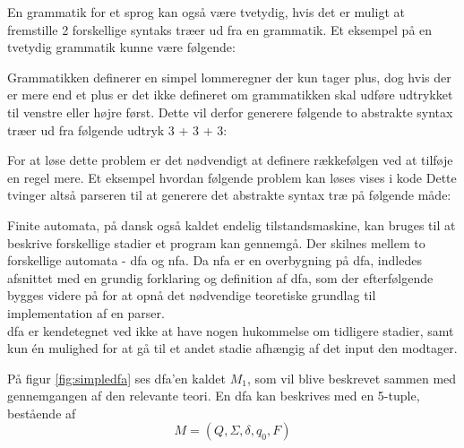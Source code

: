 

\noindent En grammatik for et sprog kan også være tvetydig, hvis det er muligt at fremstille 2 forskellige syntaks træer ud fra en grammatik. Et eksempel på en tvetydig grammatik kunne være følgende:




\noindent Grammatikken definerer en simpel lommeregner der kun tager plus, dog hvis der er mere end et plus er det ikke defineret om grammatikken skal udføre udtrykket til venstre eller højre først. Dette vil derfor generere følgende to abstrakte syntax træer ud fra følgende udtryk 3 + 3 + 3: 

\noindent For at løse dette problem er det nødvendigt at definere rækkefølgen ved at tilføje en regel mere. Et eksempel hvordan følgende problem kan løses vises i kode 
Dette tvinger altså parseren til at generere det abstrakte syntax træ på følgende måde:

Finite automata, på dansk også kaldet endelig tilstandsmaskine, kan bruges til at beskrive forskellige stadier et program kan gennemgå. Der skilnes mellem to forskellige automata - \gls{dfa} og \gls{nfa}. Da \gls{nfa} er en overbygning på \gls{dfa}, indledes afsnittet med en grundig forklaring og definition af \gls{dfa}, som der efterfølgende bygges videre på for at opnå det nødvendige teoretiske grundlag til implementation af en parser.\\

\noindent \gls{dfa} er kendetegnet ved ikke at have nogen hukommelse om tidligere stadier, samt kun én mulighed for at gå til et andet stadie afhængig af det input den modtager.


\noindent På figur \ref{fig:simpledfa} ses \gls{dfa}'en kaldet $M_1$, som vil blive beskrevet sammen med gennemgangen af den relevante teori. En \gls{dfa} kan beskrives med en 5-tuple, bestående af \[M = (Q, \Sigma, \delta, q_0, F)\]

